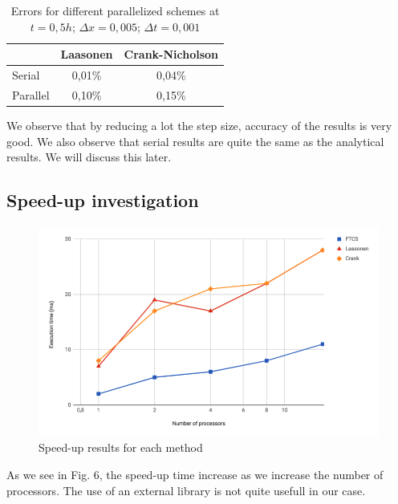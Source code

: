 \documentclass{article}
\begin{document}
                \begin{table}[H]
                    \centering
                    \caption{Errors for different parallelized schemes at $t = 0,5h$; $\Delta x=0,005$; $\Delta t=0,001$}
                    \begin{tabular}{|l|c|c|}
                        \hline
                                 & \multicolumn{1}{l|}{Laasonen} & \multicolumn{1}{l|}{Crank-Nicholson} \\ \hline
                        Serial   & 0,01\%                        & 0,04\%                               \\ \hline
                        Parallel & 0,10\%                        & 0,15\%                               \\ \hline
                    \end{tabular}
                \end{table}

                We observe that by reducing a lot the step size, accuracy of the results is very good. We also observe that serial
                results are quite the same as the analytical results. We will discuss this later.

            \subsection{Speed-up investigation}
                
            \begin{figure}[H]
                \includegraphics[width=\textwidth]{time_study.png}
                \caption{Speed-up results for each method}
            \end{figure}
            As we see in Fig. 6, the speed-up time increase as we increase the number of processors. The use of an external
            library is not quite usefull in our case.
            
\end{document}
